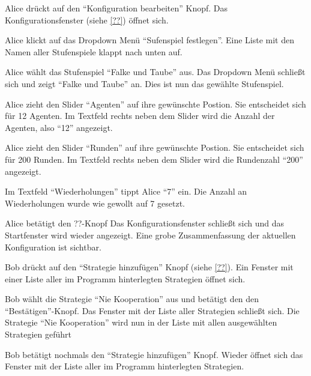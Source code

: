 \documentclass[parskip=full,11pt]{scrartcl}
\begin{document}
{Alice drückt auf den \enquote{Konfiguration bearbeiten} Knopf.}%
{Das Konfigurationsfenster (siehe \cref{??}) öffnet sich.}

{Alice klickt auf das Dropdown Menü \enquote{Sufenspiel festlegen}.}%
{Eine Liste mit den Namen aller Stufenspiele klappt nach unten auf.}

\teststep{}
{Alice wählt das Stufenspiel \enquote{Falke und Taube} aus.}
{Das Dropdown Menü schließt sich und zeigt \enquote{Falke und Taube} an. Dies ist nun das gewählte Stufenspiel.}

{Alice zieht den Slider \enquote{Agenten} auf ihre gewünschte Postion. Sie entscheidet sich für 12 Agenten.}%
{Im Textfeld rechts neben dem Slider wird die Anzahl der Agenten, also \enquote{12} angezeigt.}

{Alice zieht den Slider \enquote{Runden} auf ihre gewünschte Postion. Sie entscheidet sich für 200 Runden.}%
{Im Textfeld rechts neben dem Slider wird die Rundenzahl \enquote{200} angezeigt.}

{Im Textfeld \enquote{Wiederholungen} tippt Alice \enquote{7} ein.}%
{Die Anzahl an Wiederholungen wurde wie gewollt auf 7 gesetzt.}

{Alice betätigt den ??-Knopf}
{Das Konfigurationsfenster schließt sich und das Startfenster wird wieder angezeigt. Eine grobe Zusammenfassung der aktuellen Konfiguration ist sichtbar.}



%
{Bob drückt auf den \enquote{Strategie hinzufügen} Knopf (siehe \cref{??}).}
{Ein Fenster mit einer Liste aller im Programm hinterlegten Strategien öffnet sich.}

\teststep{}
{Bob wählt die Strategie \enquote{Nie Kooperation} aus und betätigt den den \enquote{Bestätigen}-Knopf.}
{Das Fenster mit der Liste aller Strategien schließt sich. Die Strategie \enquote{Nie Kooperation} wird nun in der Liste mit allen ausgewählten Strategien geführt}

{Bob betätigt nochmals den  \enquote{Strategie hinzufügen} Knopf.}
{Wieder öffnet sich das Fenster mit der Liste aller im Programm hinterlegten Strategien.}
\end{document}
